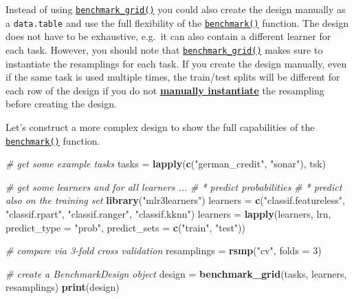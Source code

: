 \documentclass[]{scrbook}
\newenvironment{Shaded}{\begin{snugshade}}{\end{snugshade}}
\newcommand{\CommentTok}[1]{\textcolor[rgb]{0.56,0.35,0.01}{\textit{#1}}}
\newcommand{\DataTypeTok}[1]{\textcolor[rgb]{0.13,0.29,0.53}{#1}}
\newcommand{\DecValTok}[1]{\textcolor[rgb]{0.00,0.00,0.81}{#1}}
\newcommand{\KeywordTok}[1]{\textcolor[rgb]{0.13,0.29,0.53}{\textbf{#1}}}
\newcommand{\NormalTok}[1]{#1}
\newcommand{\StringTok}[1]{\textcolor[rgb]{0.31,0.60,0.02}{#1}}
\renewenvironment{Shaded} {\begin{snugshade}\small} {\end{snugshade}}
\begin{document}
Instead of using \href{https://mlr3.mlr-org.com/reference/benchmark_grid.html}{\texttt{benchmark\_grid()}} you could also create the design manually as a \texttt{data.table} and use the full flexibility of the \href{https://mlr3.mlr-org.com/reference/benchmark.html}{\texttt{benchmark()}} function.
The design does not have to be exhaustive, e.g.~it can also contain a different learner for each task.
However, you should note that \href{https://mlr3.mlr-org.com/reference/benchmark_grid.html}{\texttt{benchmark\_grid()}} makes sure to instantiate the resamplings for each task.
If you create the design manually, even if the same task is used multiple times, the train/test splits will be different for each row of the design if you do not \protect\hyperlink{resampling-inst}{\textbf{manually instantiate}} the resampling before creating the design.

Let's construct a more complex design to show the full capabilities of the \href{https://mlr3.mlr-org.com/reference/benchmark.html}{\texttt{benchmark()}} function.

\begin{Shaded}
\begin{Highlighting}[]
\CommentTok{# get some example tasks}
\NormalTok{tasks =}\StringTok{ }\KeywordTok{lapply}\NormalTok{(}\KeywordTok{c}\NormalTok{(}\StringTok{"german_credit"}\NormalTok{, }\StringTok{"sonar"}\NormalTok{), tsk)}

\CommentTok{# get some learners and for all learners ...}
\CommentTok{# * predict probabilities}
\CommentTok{# * predict also on the training set}
\KeywordTok{library}\NormalTok{(}\StringTok{"mlr3learners"}\NormalTok{)}
\NormalTok{learners =}\StringTok{ }\KeywordTok{c}\NormalTok{(}\StringTok{"classif.featureless"}\NormalTok{, }\StringTok{"classif.rpart"}\NormalTok{, }\StringTok{"classif.ranger"}\NormalTok{, }\StringTok{"classif.kknn"}\NormalTok{)}
\NormalTok{learners =}\StringTok{ }\KeywordTok{lapply}\NormalTok{(learners, lrn,}
  \DataTypeTok{predict_type =} \StringTok{"prob"}\NormalTok{, }\DataTypeTok{predict_sets =} \KeywordTok{c}\NormalTok{(}\StringTok{"train"}\NormalTok{, }\StringTok{"test"}\NormalTok{))}

\CommentTok{# compare via 3-fold cross validation}
\NormalTok{resamplings =}\StringTok{ }\KeywordTok{rsmp}\NormalTok{(}\StringTok{"cv"}\NormalTok{, }\DataTypeTok{folds =} \DecValTok{3}\NormalTok{)}

\CommentTok{# create a BenchmarkDesign object}
\NormalTok{design =}\StringTok{ }\KeywordTok{benchmark_grid}\NormalTok{(tasks, learners, resamplings)}
\KeywordTok{print}\NormalTok{(design)}
\end{Highlighting}
\end{Shaded}
\end{document}
